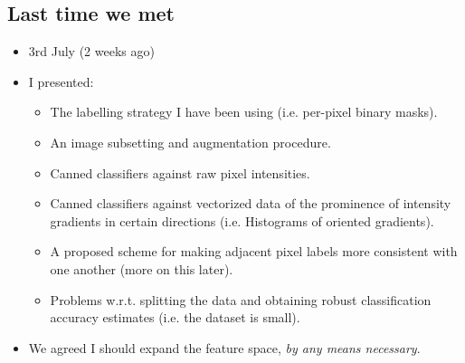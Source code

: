 \documentclass[11pt]{article} %
\begin{document}
\subsection*{Last time we met}
\begin{itemize}
	\item 3rd July (2 weeks ago)
	\item I presented:
	\begin{itemize}
		\item The labelling strategy I have been using (i.e. per-pixel binary masks).
		\item An image subsetting and augmentation procedure.
		\item Canned classifiers against raw pixel intensities.
		\item Canned classifiers against vectorized data of the prominence of intensity gradients in certain directions (i.e. Histograms of oriented gradients).
		\item A proposed scheme for making adjacent pixel labels more consistent with one another (more on this later).
		\item Problems w.r.t. splitting the data and obtaining robust classification accuracy estimates (i.e. the dataset is small).
	\end{itemize}
	\item We agreed I should expand the feature space, \emph{by any means necessary}.
\end{itemize}
\end{document}
